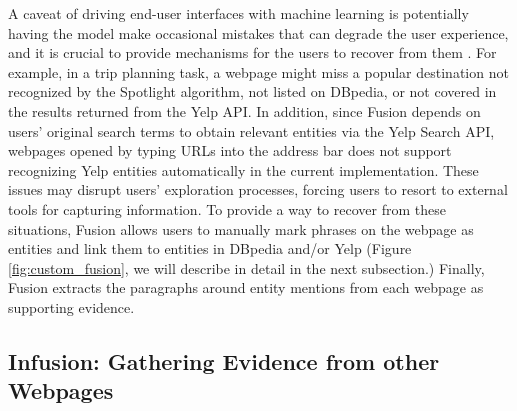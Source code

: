 A caveat of driving end-user interfaces with machine learning is potentially having the model make occasional mistakes that can degrade the user experience, and it is crucial to provide mechanisms for the users to recover from them \cite{lewis1995designing,lee2010gracefully,kocielnik2019will}. For example, in a trip planning task, a webpage might miss a popular destination not recognized by the Spotlight algorithm, not listed on DBpedia, or not covered in the results returned from the Yelp API. In addition, since Fusion depends on users' original search terms to obtain relevant entities via the Yelp Search API, webpages opened by typing URLs into the address bar does not support recognizing Yelp entities automatically in the current implementation. These issues may disrupt users' exploration processes, forcing users to resort to external tools for capturing information. To provide a way to recover from these situations, Fusion allows users to manually mark phrases on the webpage as entities and link them to entities in DBpedia and/or Yelp (Figure \ref{fig:custom_fusion}, we will describe in detail in the next subsection.) Finally, Fusion extracts the paragraphs around entity mentions from each webpage as supporting evidence.

\subsection{Infusion: Gathering Evidence from other Webpages}

